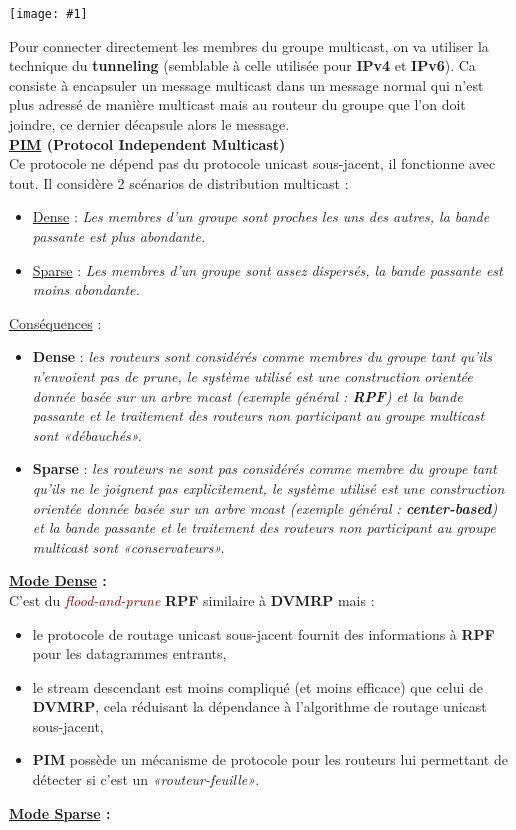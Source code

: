 \documentclass{article}
\newcommand{\ora}[1]{\textcolor{darko}{#1}}
\newcommand{\red}[1]{\textcolor{darkred}{#1}}
\newcommand{\imgR}[2]{\begin{center}\texttt{[image: \#1]}\end{center}}
\newcommand{\point}[2]{\item \ora{\underline{#1}} : \textit{#2}}
\newcommand{\bfp}[2]{\item \textbf{#1} : \textit{#2}}
\begin{document}
\imgR{CN_103.png}{200}

Pour connecter directement les membres du groupe multicast, on va utiliser la technique du \textbf{tunneling} 
(semblable à celle utilisée pour \textbf{IPv4} et \textbf{IPv6}). Ca consiste à encapsuler un message multicast
dans un message normal qui n'est plus adressé de manière multicast mais au routeur du groupe que l'on doit 
joindre, ce dernier décapsule alors le message. \\

\noindent\textbf{\underline{PIM} (Protocol Independent Multicast)} \\

\noindent Ce protocole ne dépend pas du protocole unicast sous-jacent, il fonctionne avec tout. Il considère 2 
scénarios de distribution multicast : 
\begin{itemize}
\point{Dense}{Les membres d'un groupe sont proches les uns des autres, la bande passante est plus abondante.}
\point{Sparse}{Les membres d'un groupe sont assez dispersés, la bande passante est moins abondante.}\\
\end{itemize}

\underline{Conséquences} : 
\begin{itemize}
\bfp{Dense}{les routeurs sont considérés comme membres du groupe tant qu'ils n'envoient pas de \textit{prune},
le système utilisé est une construction orientée donnée basée sur un arbre mcast (exemple général : 
\textbf{RPF}) et la bande passante et le traitement des routeurs non participant au groupe multicast sont 
«débauchés».}
\bfp{Sparse}{les routeurs ne sont pas considérés comme membre du groupe tant qu'ils ne le joignent pas 
explicitement, le système utilisé est une construction orientée donnée basée sur un arbre mcast (exemple général 
: \textbf{center-based}) et la bande passante et le traitement des routeurs non participant au groupe multicast 
sont «conservateurs».} \\
\end{itemize} 

\textbf{\underline{Mode Dense} : } \\

C'est du \textit{\red{flood-and-prune}} \textbf{RPF} similaire à \textbf{DVMRP} mais :
\begin{itemize}
\item le protocole de routage unicast sous-jacent fournit des informations à \textbf{RPF} pour les datagrammes 
entrants,
\item le stream descendant est moins compliqué (et moins efficace) que celui de \textbf{DVMRP}, cela réduisant la 
dépendance à l'algorithme de routage unicast sous-jacent,
\item \textbf{PIM} possède un mécanisme de protocole pour les routeurs lui permettant de détecter si c'est un 
\textit{«routeur-feuille»}. \\
\end{itemize}
\newpage
\textbf{\underline{Mode Sparse} : } \\
\end{document}
